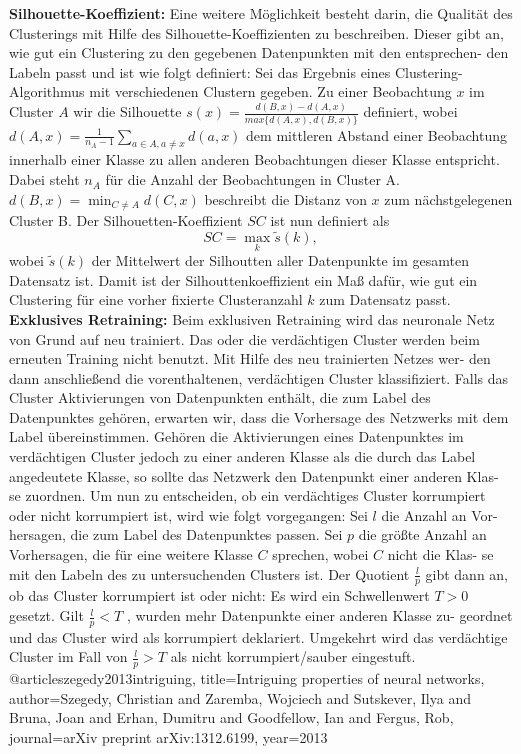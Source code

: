 \documentclass[twoside, 11pt,a4paper]{article}
\numberwithin{equation}{section}
\begin{document}
		\noindent \textbf{Silhouette-Koeffizient:} Eine weitere Möglichkeit besteht darin, die Qualität
		des Clusterings mit Hilfe des Silhouette-Koeffizienten zu beschreiben. Dieser gibt
		an, wie gut ein Clustering zu den gegebenen Datenpunkten mit den entsprechen-
		den Labeln passt und ist wie folgt definiert: Sei das Ergebnis eines Clustering-
		Algorithmus mit verschiedenen Clustern gegeben. Zu einer Beobachtung $x$ im Cluster $A$ wir die Silhouette $s(x) = \frac{d(B,x)-d(A,x)}{max\lbrace d(A,x), d(B,x) \rbrace}$ definiert, wobei $d(A,x)  = \frac{1}{n_A -1}\sum_{a \in A, a \neq x}{d(a,x)}$ dem mittleren Abstand einer Beobachtung innerhalb einer Klasse zu allen anderen Beobachtungen dieser Klasse entspricht.
		Dabei steht $n_A$ für die Anzahl der Beobachtungen in Cluster A. $d(B,x) = \min_{C \neq A}d(C,x)$ beschreibt die Distanz von $x$ zum nächstgelegenen Cluster B. Der Silhouetten-Koeffizient $SC$ ist nun definiert als
		\begin{equation}
			SC = \max_k \tilde{s}(k),
		\end{equation}
		wobei $\tilde{s}(k)$ der Mittelwert der Silhoutten aller Datenpunkte im gesamten Datensatz ist. Damit ist der Silhouttenkoeffizient ein Maß dafür, wie gut ein Clustering für eine vorher fixierte Clusteranzahl $k$ zum Datensatz passt.\\
		
		\noindent \textbf{Exklusives Retraining:} Beim exklusiven Retraining wird das neuronale Netz
		von Grund auf neu trainiert. Das oder die verdächtigen Cluster werden beim
		erneuten Training nicht benutzt. Mit Hilfe des neu trainierten Netzes wer-
		den dann anschließend die vorenthaltenen, verdächtigen Cluster klassifiziert.
		Falls das Cluster Aktivierungen von Datenpunkten enthält, die zum Label des
		Datenpunktes gehören, erwarten wir, dass die Vorhersage des Netzwerks mit
		dem Label übereinstimmen. Gehören die Aktivierungen eines Datenpunktes im
		verdächtigen Cluster jedoch zu einer anderen Klasse als die durch das Label
		angedeutete Klasse, so sollte das Netzwerk den Datenpunkt einer anderen Klas-
		se zuordnen. Um nun zu entscheiden, ob ein verdächtiges Cluster korrumpiert
		oder nicht korrumpiert ist, wird wie folgt vorgegangen: Sei $l$ die Anzahl an Vor-
		hersagen, die zum Label des Datenpunktes passen. Sei $p$ die größte Anzahl an
		Vorhersagen, die für eine weitere Klasse $C$ sprechen, wobei $C$ nicht die Klas-
		se mit den Labeln des zu untersuchenden Clusters ist. Der Quotient $\frac{l}{p}$ gibt
		dann an, ob das Cluster korrumpiert ist oder nicht: Es wird ein Schwellenwert
		$T > 0$ gesetzt. Gilt $\frac{l}{p} < T$ , wurden mehr Datenpunkte einer anderen Klasse zu-
		geordnet und das Cluster wird als korrumpiert deklariert. Umgekehrt wird das
		verdächtige Cluster im Fall von $\frac{l}{p} > T$ als nicht korrumpiert/sauber eingestuft.
		@article{szegedy2013intriguing,
			title={Intriguing properties of neural networks},
			author={Szegedy, Christian and Zaremba, Wojciech and Sutskever, Ilya and Bruna, Joan and Erhan, Dumitru and Goodfellow, Ian and Fergus, Rob},
			journal={arXiv preprint arXiv:1312.6199},
			year={2013}
		}
		
\end{document}

